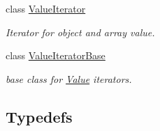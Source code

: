 \begin{DoxyCompactItemize}
class \hyperlink{classJson_1_1ValueIterator}{Value\+Iterator}
\begin{DoxyCompactList}\small\item\em Iterator for object and array value. \end{DoxyCompactList}\item 
class \hyperlink{classJson_1_1ValueIteratorBase}{Value\+Iterator\+Base}
\begin{DoxyCompactList}\small\item\em base class for \hyperlink{classJson_1_1Value}{Value} iterators. \end{DoxyCompactList}\end{DoxyCompactItemize}
\subsection*{Typedefs}

